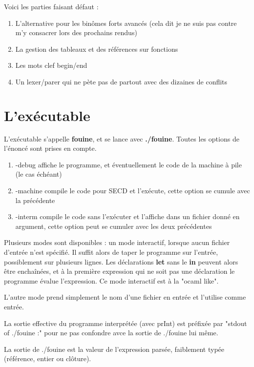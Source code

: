 \documentclass[a4paper,10pt]{report}
\begin{document}
Voici les parties faisant défaut :
\begin{enumerate}
\item L'alternative pour les binômes forts avancés (cela dit je ne suis pas contre m'y consacrer lors des prochains rendus)
\item La gestion des tableaux et des références sur fonctions
\item Les mots clef begin/end
\item Un lexer/parer qui ne pète pas de partout avec des dizaines de conflits
\end{enumerate}

\section{L'exécutable}

L'exécutable s'appelle \textbf{fouine}, et se lance avec \textbf{./fouine}.
Toutes les options de l'énoncé sont prises en compte.  

\begin{enumerate}
\item -debug affiche le programme, et éventuellement le code de la machine à pile (le cas échéant)
\item -machine compile le code pour SECD et l'exécute, cette option se cumule avec la précédente
\item -interm compile le code sans l'exécuter et l'affiche dans un fichier donné en argument, cette option peut se cumuler avec les deux précédentes
\end{enumerate}
  
Plusieurs modes sont disponibles : un mode interactif, lorsque aucun fichier d'entrée n'est spécifié.  
Il suffit alors de taper le programme sur l'entrée, possiblement sur plusieurs lignes. Les déclarations \textbf{let} sans le \textbf{in} peuvent alors être enchaînées, et à la première expression qui ne soit pas une déclaration le programme évalue l'expression. Ce mode interactif est à la "ocaml like".  
  
L'autre mode prend simplement le nom d'une fichier en entrée et l'utilise comme entrée.  
  
La sortie effective du programme interprétée (avec prInt) est préfixée par "stdout of ./fouine :" pour ne pas confondre avce la sortie de ./fouine lui même.  
  
La sortie de ./fouine est la valeur de l'expression parsée, faiblement typée (référence, entier ou clôture).
\end{document}
